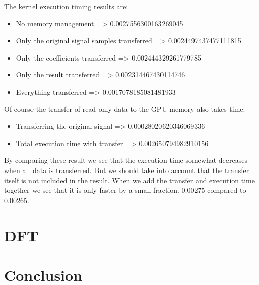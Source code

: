 The kernel execution timing results are:
\begin{itemize}
    \item No memory management => 0.0027556300163269045
    \item Only the original signal samples transferred => 0.0024497437477111815
    \item Only the coefficients transferred => 0.002444329261779785
    \item Only the result transferred => 0.002314467430114746
    \item Everything transferred => 0.0017078185081481933
\end{itemize}

Of course the transfer of read-only data to the GPU memory also takes time:
\begin{itemize}
    \item Transferring the original signal => 0.00028020620346069336
    \item Total execution time with transfer => 0.002650794982910156
\end{itemize}

By comparing these result we see that the execution time somewhat decreases when all data is transferred. But we should take into account that the transfer itself is not included in the result. When we add the transfer and execution time together we see that it is only faster by a small fraction. 0.00275 compared to 0.00265.

  


\newpage

\section{DFT}
\label{sec:DFT}


\newpage
\section{Conclusion}
\label{sec:conclusion}

